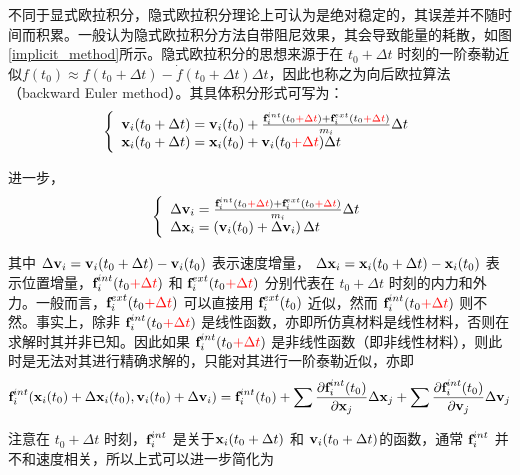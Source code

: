 不同于显式欧拉积分，隐式欧拉积分理论上可认为是绝对稳定的，其误差并不随时间而积累。一般认为隐式欧拉积分方法自带阻尼效果，其会导致能量的耗散，如图\ref{implicit_method}所示。隐式欧拉积分的思想来源于在 $t_0 + \Delta t$ 时刻的一阶泰勒近似$f(t_0) \approx f(t_0 + \Delta t) - \dot{f}(t_0 + \Delta t)\Delta t$，因此也称之为向后欧拉算法（backward Euler method）。其具体积分形式可写为：
\begin{equation}
\left\{ \begin{array}{l}
\textbf{v}_i(t_0+\Delta t) = \textbf{v}_i(t_0)+\frac{\textbf{f}_i^{int}(t_0 \textcolor{red}{+ \Delta t}) + \textbf{f}_i^{ext}(t_0 \textcolor{red}
                                  {+ \Delta t})}{m_i}\Delta t\\
\textbf{x}_i(t_0+\Delta t) = \textbf{x}_i(t_0)+\textbf{v}_i(t_0 \textcolor{red}{ + \Delta t})\Delta t
\end{array} \right.
\end{equation}

进一步，
\begin{equation}
\label{eqa25}
\left\{ \begin{array}{l}
\Delta \textbf{v}_i = \frac{\textbf{f}_i^{int}(t_0 \textcolor{red}{+ \Delta t}) + \textbf{f}_i^{ext}(t_0 \textcolor{red}
                                  {+ \Delta t})}{m_i}\Delta t\\
\Delta \textbf{x}_i = \left(\textbf{v}_i(t_0) + \Delta \textbf{v}_i\right)\Delta t
\end{array} \right.
\end{equation}

其中 $\Delta \textbf{v}_i = \textbf{v}_i(t_0 + \Delta t) - \textbf{v}_i(t_0)$ 表示速度增量， $\Delta \textbf{x}_i = \textbf{x}_i(t_0 + \Delta t) - \textbf{x}_i(t_0)$ 表示位置增量，$\textbf{f}_i^{int}(t_0 \textcolor{red}{+ \Delta t})$ 和 $\textbf{f}_i^{ext}(t_0 \textcolor{red}{+ \Delta t})$ 分别代表在 $t_0 + \Delta t$ 时刻的内力和外力。一般而言，$\textbf{f}_i^{ext}(t_0 \textcolor{red}{+ \Delta t})$ 可以直接用 $\textbf{f}_i^{ext}(t_0)$ 近似，然而 $\textbf{f}_i^{int}(t_0 \textcolor{red}{+ \Delta t})$ 则不然。事实上，除非 $\textbf{f}_i^{int}(t_0 \textcolor{red}{+ \Delta t})$ 是线性函数，亦即所仿真材料是线性材料，否则在求解时其并非已知。因此如果 $\textbf{f}_i^{int}(t_0 \textcolor{red}{+ \Delta t})$ 是非线性函数（即非线性材料），则此时是无法对其进行精确求解的，只能对其进行一阶泰勒近似，亦即
\begin{equation}
\textbf{f}_i^{int}(\textbf{x}_i(t_0) + \Delta \textbf{x}_i(t_0),\textbf{v}_i(t_0)+\Delta \textbf{v}_i) = \textbf{f}_i^{int}(t_0) +
                                                         \sum\frac{\partial \textbf{f}_i^{int}(t_0)}{\partial \textbf{x}_j}\Delta \textbf{x}_j+
                                                         \sum\frac{\partial \textbf{f}_i^{int}(t_0)}{\partial \textbf{v}_j}\Delta \textbf{v}_j
\end{equation}

注意在 $t_0 + \Delta t$ 时刻，$\textbf{f}_i^{int}$ 是关于$\textbf{x}_i(t_0 + \Delta t)$ 和 $\textbf{v}_i(t_0 + \Delta t)$的函数，通常 $\textbf{f}_i^{int}$ 并不和速度相关，所以上式可以进一步简化为

